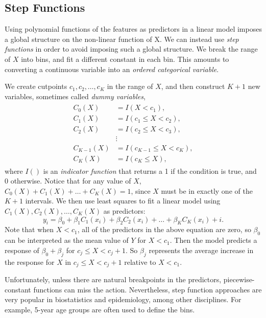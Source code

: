 \documentclass{article}
\numberwithin{equation}{section}
\begin{document}
\begin{enumerate}
\subsection{Step Functions}
Using polynomial functions of the features as predictors in a linear model imposes a global structure on the non-linear function of X. We can instead use \textit{step functions} in order to avoid imposing such a global structure. We break the range of $X$ into bins, and fit a different constant in each bin. This amounts to converting a continuous variable into an \textit{ordered categorical variable}.

We create cutpoints $c_1, c_2,\dots,c_K$ in the range of $X$, and then construct $K + 1$ new variables, sometimes called \textit{dummy variables},
\begin{align}
\begin{split}
    C_0(X) &= I(X<c_1), \\
    C_1(X) &= I(c_1 \leq X < c_2),\\
    C_2(X) &= I(c_2 \leq X<c_3),\\
    &\vdots \\
    C_{K-1}(X) &= I(c_{K-1} \leq X < c_K),\\
    C_K(X) &= I(c_K \leq X),
\end{split}
\end{align}
where $I()$ is an \textit{indicator function} that returns a 1 if the condition is true, and 0 otherwise. Notice that for any value of $X$, $C_0(X) + C_1(X) + \dots + C_K(X) = 1$, since $X$ must
be in exactly one of the $K + 1$ intervals. We then use least squares to fit a linear model using $C_1(X), C_2(X),\dots,C_K(X)$ as predictors:
\begin{equation}
    y_i = \beta_0 + \beta_1C_1(x_i) + \beta_2C_2(x_i) + \dots + \beta_KC_K(x_i) + i.
\end{equation}
Note that when $X<c_1$, all of the predictors in the above equation are zero, so $\beta_0$ can be interpreted as the mean value of $Y$ for $X<c_1$. Then the model predicts a response of $\beta_0+\beta_j$ for $c_j \leq X<c_j+1$. So $\beta_j$ represents the average increase in the response for $X$ in $c_j \leq X<c_j+1$ relative to $X<c_1$.

Unfortunately, unless there are natural breakpoints in the predictors, piecewise-constant functions can miss the action. Nevertheless, step function approaches are very popular in biostatistics and epidemiology, among other disciplines. For example, 5-year age groups are often used to define the bins.


\end{enumerate}
\end{document}
